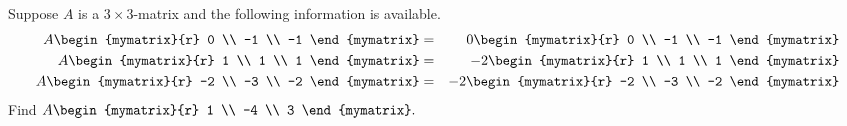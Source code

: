\begin{enumialphparenastyle}
\begin{ex} Suppose $A$ is a $3\times 3$-matrix and the following information is
available. 
\begin{eqnarray*}
A\begin{mymatrix}{r}
0 \\
-1 \\
-1
\end{mymatrix} &=&0\begin{mymatrix}{r}
0 \\
-1 \\
-1
\end{mymatrix} \\
A\begin{mymatrix}{r}
1 \\
1 \\
1
\end{mymatrix} &=&-2\begin{mymatrix}{r}
1 \\
1 \\
1
\end{mymatrix} \\
A\begin{mymatrix}{r}
-2 \\
-3 \\
-2
\end{mymatrix} &=&-2\begin{mymatrix}{r}
-2 \\
-3 \\
-2
\end{mymatrix}
\end{eqnarray*}
Find $A\begin{mymatrix}{r}
1 \\
-4 \\
3
\end{mymatrix}. $
\end{ex}


\end{enumialphparenastyle}
